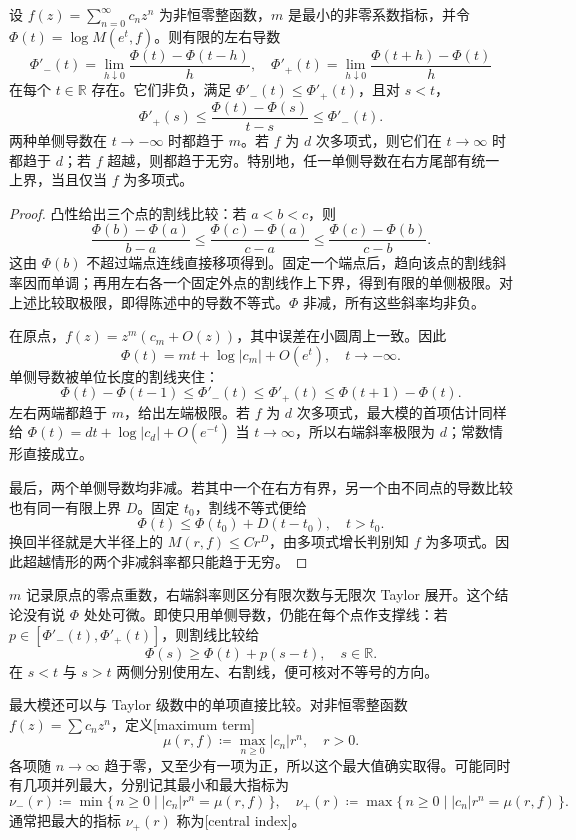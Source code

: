 \begin{proposition}[对数最大模的斜率]\label{b3:prop:19-convex-slopes}
设 \(f(z)=\sum_{n=0}^{\infty}c_nz^n\) 为非恒零整函数，\(m\) 是最小的非零系数指标，并令 \(\Phi(t)=\log M(e^t,f)\)。则有限的左右导数
\[
 \Phi'_-(t)=\lim_{h\downarrow0}\frac{\Phi(t)-\Phi(t-h)}h,\quad
 \Phi'_+(t)=\lim_{h\downarrow0}\frac{\Phi(t+h)-\Phi(t)}h
\]
在每个 \(t\in\mathbb R\) 存在。它们非负，满足 \(\Phi'_-(t)\le\Phi'_+(t)\)，且对 \(s<t\)，
\[
 \Phi'_+(s)\le\frac{\Phi(t)-\Phi(s)}{t-s}\le\Phi'_-(t).
\]
两种单侧导数在 \(t\to-\infty\) 时都趋于 \(m\)。若 \(f\) 为 \(d\) 次多项式，则它们在 \(t\to\infty\) 时都趋于 \(d\)；若 \(f\) 超越，则都趋于无穷。特别地，任一单侧导数在右方尾部有统一上界，当且仅当 \(f\) 为多项式。
\end{proposition}
\begin{proof}
凸性给出三个点的割线比较：若 \(a<b<c\)，则
\[
 \frac{\Phi(b)-\Phi(a)}{b-a}
 \le\frac{\Phi(c)-\Phi(a)}{c-a}
 \le\frac{\Phi(c)-\Phi(b)}{c-b}.
\]
这由 \(\Phi(b)\) 不超过端点连线直接移项得到。固定一个端点后，趋向该点的割线斜率因而单调；再用左右各一个固定外点的割线作上下界，得到有限的单侧极限。对上述比较取极限，即得陈述中的导数不等式。\(\Phi\) 非减，所有这些斜率均非负。

在原点，\(f(z)=z^m(c_m+O(z))\)，其中误差在小圆周上一致。因此
\[
 \Phi(t)=mt+\log|c_m|+O(e^t),\quad t\to-\infty.
\]
单侧导数被单位长度的割线夹住：
\[
 \Phi(t)-\Phi(t-1)
 \le\Phi'_-(t)\le\Phi'_+(t)
 \le\Phi(t+1)-\Phi(t).
\]
左右两端都趋于 \(m\)，给出左端极限。若 \(f\) 为 \(d\) 次多项式，最大模的首项估计同样给 \(\Phi(t)=dt+\log|c_d|+O(e^{-t})\) 当 \(t\to\infty\)，所以右端斜率极限为 \(d\)；常数情形直接成立。

最后，两个单侧导数均非减。若其中一个在右方有界，另一个由不同点的导数比较也有同一有限上界 \(D\)。固定 \(t_0\)，割线不等式便给
\[
 \Phi(t)\le\Phi(t_0)+D(t-t_0),\quad t>t_0.
\]
换回半径就是大半径上的 \(M(r,f)\le C r^D\)，由多项式增长判别知 \(f\) 为多项式。因此超越情形的两个非减斜率都只能趋于无穷。
\end{proof}
\(m\) 记录原点的零点重数，右端斜率则区分有限次数与无限次 Taylor 展开。这个结论没有说 \(\Phi\) 处处可微。即使只用单侧导数，仍能在每个点作支撑线：若 \(p\in[\Phi'_-(t),\Phi'_+(t)]\)，则割线比较给
\[
 \Phi(s)\ge\Phi(t)+p(s-t),\quad s\in\mathbb R.
\]
在 \(s<t\) 与 \(s>t\) 两侧分别使用左、右割线，便可核对不等号的方向。

\ProseParagraphBreak

最大模还可以与 Taylor 级数中的单项直接比较。对非恒零整函数 \(f(z)=\sum c_nz^n\)，定义[maximum term]
\[
 \mu(r,f)\coloneqq\max_{n\ge0}|c_n|r^n,\quad r>0.
\]
各项随 \(n\to\infty\) 趋于零，又至少有一项为正，所以这个最大值确实取得。可能同时有几项并列最大，分别记其最小和最大指标为
\[
 \nu_-(r)\coloneqq\min\{\,n\ge0\mid |c_n|r^n=\mu(r,f)\,\},\quad
 \nu_+(r)\coloneqq\max\{\,n\ge0\mid |c_n|r^n=\mu(r,f)\,\}.
\]
通常把最大的指标 \(\nu_+(r)\) 称为[central index]。

